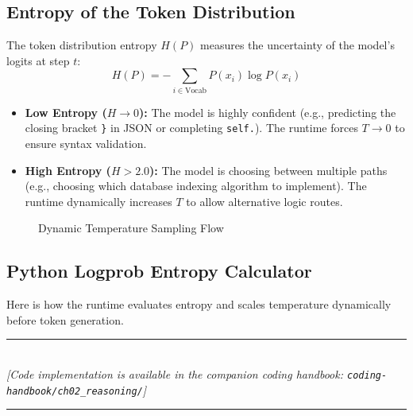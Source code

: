 \subsection{Entropy of the Token Distribution}
The token distribution entropy $H(P)$ measures the uncertainty of the model's logits at step $t$:
\begin{equation}
H(P) = -\sum_{i \in \text{Vocab}} P(x_i) \log P(x_i)
\end{equation}

\begin{itemize}
    \item \textbf{Low Entropy ($H \to 0$):} The model is highly confident (e.g., predicting the closing bracket \texttt{\}} in JSON or completing \texttt{self.}). The runtime forces $T \to 0$ to ensure syntax validation.
    \item \textbf{High Entropy ($H > 2.0$):} The model is choosing between multiple paths (e.g., choosing which database indexing algorithm to implement). The runtime dynamically increases $T$ to allow alternative logic routes.
\end{itemize}

\begin{figure}[h]
\centering
{}
\caption{Dynamic Temperature Sampling Flow}
\end{figure}

\subsection{Python Logprob Entropy Calculator}
Here is how the runtime evaluates entropy and scales temperature dynamically before token generation.


\begin{center}
\noindent\rule{0.6\textwidth}{0.4pt} \\
\vspace{0.3em}
\textit{[Code implementation is available in the companion coding handbook: \texttt{coding-handbook/ch02\_reasoning/}]} \\
\noindent\rule{0.6\textwidth}{0.4pt}
\end{center}


